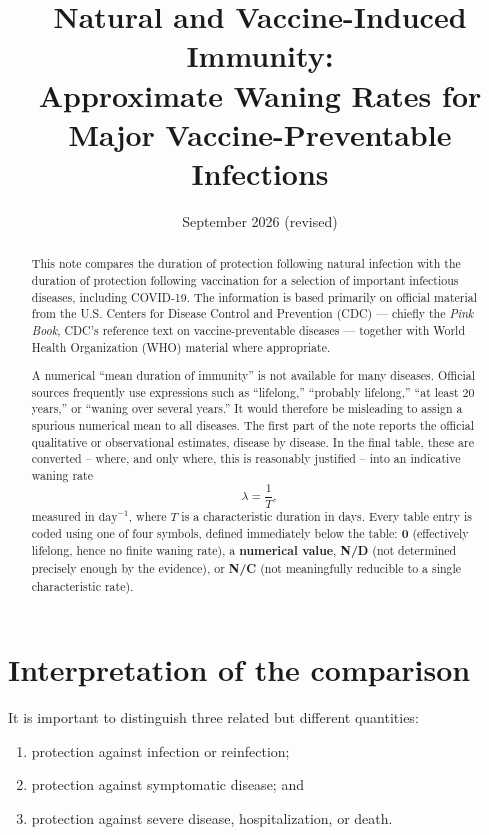 \documentclass[11pt]{article}
\title{Natural and Vaccine-Induced Immunity:\\
Approximate Waning Rates for Major Vaccine-Preventable Infections}
\author{}
\date{September 2026 (revised)}
\begin{document}
\maketitle

\begin{abstract}
This note compares the duration of protection following natural infection with
the duration of protection following vaccination for a selection of important
infectious diseases, including COVID-19. The information is based primarily on
official material from the U.S. Centers for Disease Control and Prevention
(CDC) --- chiefly the \emph{Pink Book}, CDC's reference text on vaccine-preventable
diseases --- together with World Health Organization (WHO) material where
appropriate.

A numerical ``mean duration of immunity'' is not available for many diseases.
Official sources frequently use expressions such as ``lifelong,'' ``probably
lifelong,'' ``at least 20 years,'' or ``waning over several years.'' It would
therefore be misleading to assign a spurious numerical mean to all diseases.
The first part of the note reports the official qualitative or observational
estimates, disease by disease. In the final table, these are converted --
where, and only where, this is reasonably justified -- into an indicative
waning rate
\[
        \lambda = \frac{1}{T},
\]
measured in $\mathrm{day}^{-1}$, where $T$ is a characteristic duration in
days. Every table entry is coded using one of four symbols, defined
immediately below the table: \textbf{0} (effectively lifelong, hence no
finite waning rate), a \textbf{numerical value}, \textbf{N/D} (not
determined precisely enough by the evidence), or \textbf{N/C} (not
meaningfully reducible to a single characteristic rate).
\end{abstract}

\section{Interpretation of the comparison}

It is important to distinguish three related but different quantities:

\begin{enumerate}
\item protection against infection or reinfection;
\item protection against symptomatic disease; and
\item protection against severe disease, hospitalization, or death.
\end{enumerate}
\end{document}
